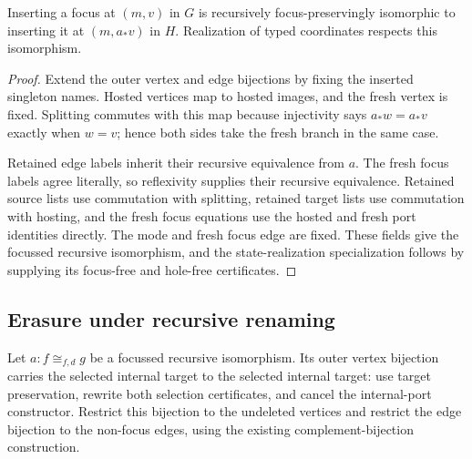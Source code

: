 \begin{theorem}
Inserting a focus at $(m,v)$ in $G$ is recursively focus-preservingly
isomorphic to inserting it at $(m,a_*v)$ in $H$. Realization of typed
coordinates respects this isomorphism.
\end{theorem}
\begin{proof}
Extend the outer vertex and edge bijections by fixing the inserted singleton
names. Hosted vertices map to hosted images, and the fresh vertex is fixed.
Splitting commutes with this map because injectivity says $a_*w=a_*v$ exactly
when $w=v$; hence both sides take the fresh branch in the same case.

Retained edge labels inherit their recursive equivalence from $a$. The fresh
focus labels agree literally, so reflexivity supplies their recursive
equivalence. Retained source lists use commutation with splitting, retained
target lists use commutation with hosting, and the fresh focus equations use
the hosted and fresh port identities directly. The mode and fresh focus edge
are fixed. These fields give the focussed recursive isomorphism, and the
state-realization specialization follows by supplying its focus-free and
hole-free certificates.
\end{proof}

\subsection{Erasure under recursive renaming}
Let $a:f\cong_{f,d}g$ be a focussed recursive isomorphism. Its outer vertex
bijection carries the selected internal target to the selected internal target:
use target preservation, rewrite both selection certificates, and cancel the
internal-port constructor. Restrict this bijection to the undeleted vertices
and restrict the edge bijection to the non-focus edges, using the existing
complement-bijection construction.

